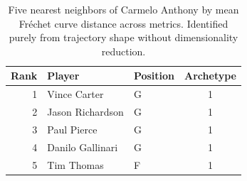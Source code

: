 \begin{table}[htbp]
  \centering\small
  \begin{tabular}{rllc}
    \toprule
    Rank & Player & Position & Archetype \\
    \midrule
    1 & Vince Carter & G & 1 \\
    2 & Jason Richardson & G & 1 \\
    3 & Paul Pierce & G & 1 \\
    4 & Danilo Gallinari & G & 1 \\
    5 & Tim Thomas & F & 1 \\
    \bottomrule
  \end{tabular}
  \caption{Five nearest neighbors of Carmelo Anthony by mean Fr\'{e}chet curve distance across metrics. Identified purely from trajectory shape without dimensionality reduction.}
  \label{tab:Carmelo_Anthony_frechet_curve_neighbors}
\end{table}


